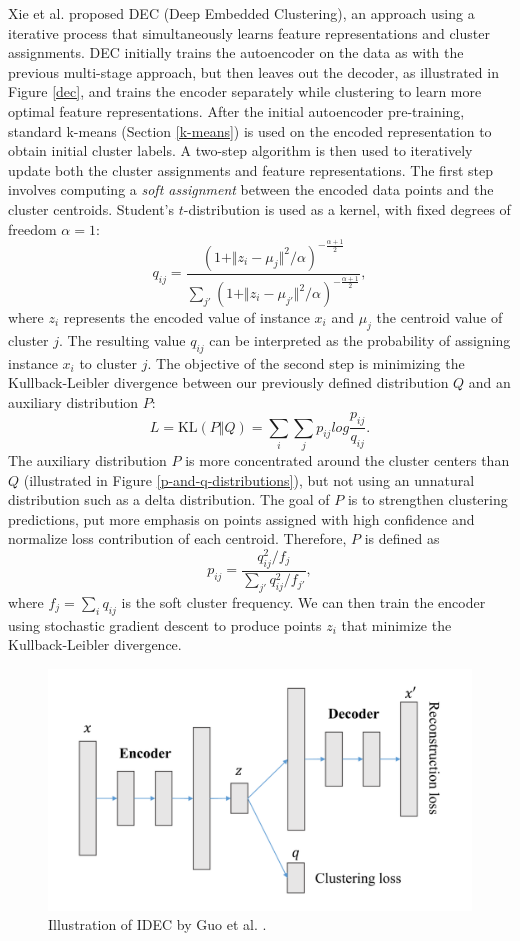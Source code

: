 Xie et al. \cite{dec} proposed DEC (Deep Embedded Clustering), an approach using a iterative process that simultaneously learns feature representations and cluster assignments. DEC initially trains the autoencoder on the data as with the previous multi-stage approach, but then leaves out the decoder, as illustrated in Figure \ref{dec}, and trains the encoder separately while clustering to learn more optimal feature representations. After the initial autoencoder pre-training, standard k-means (Section \ref{k-means}) is used on the encoded representation to obtain initial cluster labels. A two-step algorithm is then used to iteratively update both the cluster assignments and feature representations. The first step involves computing a \textit{soft assignment} between the encoded data points and the cluster centroids. Student's $t$-distribution is used as a kernel, with fixed degrees of freedom $\alpha = 1$:
$$q_{ij} = \frac{(1 + \Vert z_i - \mu_j \Vert^2 / \alpha)^{-\frac{\alpha+1}{2}}}{\sum_{j'}(1 + \Vert z_i - \mu_{j'} \Vert^2 / \alpha)^{-\frac{\alpha+1}{2}}},$$
where $z_i$ represents the encoded value of instance $x_i$ and $\mu_j$ the centroid value of cluster $j$. The resulting value $q_{ij}$ can be interpreted as the probability of assigning instance $x_i$ to cluster $j$. The objective of the second step is minimizing the Kullback-Leibler divergence between our previously defined distribution $Q$ and an auxiliary distribution $P$:
$$L = \text{KL}(P \Vert Q) = \sum_i \sum_j p_{ij} log\frac{p_{ij}}{q_{ij}}.$$
The auxiliary distribution $P$ is more concentrated around the cluster centers than $Q$ (illustrated in Figure \ref{p-and-q-distributions}), but not using an unnatural distribution such as a delta distribution. The goal of $P$ is to strengthen clustering predictions, put more emphasis on points assigned with high confidence and normalize loss contribution of each centroid. Therefore, $P$ is defined as
$$p_{ij} = \frac{q_{ij}^2 / f_j}{\sum_{j'}q_{ij}^2 / f_{j'}},$$
where $f_j = \sum_i q_{ij}$ is the soft cluster frequency. We can then train the encoder using stochastic gradient descent to produce points $z_i$ that minimize the Kullback-Leibler divergence. \cite{dec}

\begin{figure}
\centering
	\includegraphics[width=0.7\linewidth]{idec.png}
	\caption{Illustration of IDEC by Guo et al. \cite{idec}.}
	\label{idec}
\end{figure}

